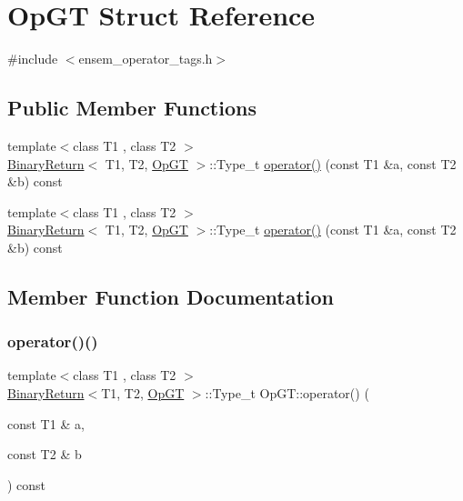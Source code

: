 \hypertarget{structOpGT}{}\section{Op\+GT Struct Reference}
\label{structOpGT}


{\ttfamily \#include $<$ensem\+\_\+operator\+\_\+tags.\+h$>$}

\subsection*{Public Member Functions}
\begin{DoxyCompactItemize}
\item 
{\footnotesize template$<$class T1 , class T2 $>$ }\\\mbox{\hyperlink{structBinaryReturn}{Binary\+Return}}$<$ T1, T2, \mbox{\hyperlink{structOpGT}{Op\+GT}} $>$\+::Type\+\_\+t \mbox{\hyperlink{structOpGT_a8571b221a0c893055b34bdfbd8922fd4}{operator()}} (const T1 \&a, const T2 \&b) const
\item 
{\footnotesize template$<$class T1 , class T2 $>$ }\\\mbox{\hyperlink{structBinaryReturn}{Binary\+Return}}$<$ T1, T2, \mbox{\hyperlink{structOpGT}{Op\+GT}} $>$\+::Type\+\_\+t \mbox{\hyperlink{structOpGT_a8571b221a0c893055b34bdfbd8922fd4}{operator()}} (const T1 \&a, const T2 \&b) const
\end{DoxyCompactItemize}


\subsection{Member Function Documentation}
\mbox{\label{structOpGT_a8571b221a0c893055b34bdfbd8922fd4}} 
\subsubsection{\texorpdfstring{operator()()}{operator()()}\hspace{0.1cm}{\footnotesize\ttfamily [1/2]}}
{\footnotesize\ttfamily template$<$class T1 , class T2 $>$ \\
\mbox{\hyperlink{structBinaryReturn}{Binary\+Return}}$<$T1, T2, \mbox{\hyperlink{structOpGT}{Op\+GT}} $>$\+::Type\+\_\+t Op\+G\+T\+::operator() (\begin{DoxyParamCaption}\item[{const T1 \&}]{a,  }\item[{const T2 \&}]{b }\end{DoxyParamCaption}) const\hspace{0.3cm}{\ttfamily [inline]}}

